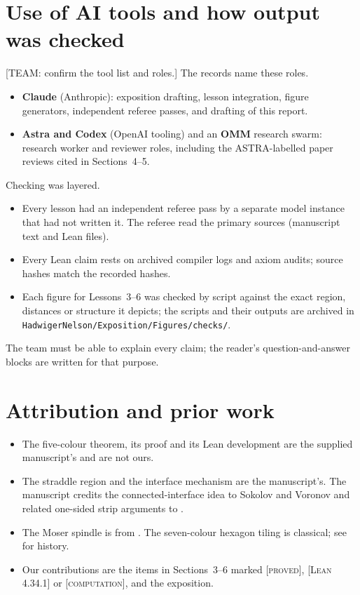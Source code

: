 \documentclass[11pt]{article}
\theoremstyle{definition}
\theoremstyle{remark}
\newcommand{\st}[1]{\textsc{[#1]}}
\begin{document}
\section{Use of AI tools and how output was checked}
[TEAM: confirm the tool list and roles.] The records name these roles.
\begin{itemize}
\item \textbf{Claude} (Anthropic): exposition drafting, lesson integration, figure generators, independent referee passes, and drafting of this report.
\item \textbf{Astra and Codex} (OpenAI tooling) and an \textbf{OMM} research swarm: research worker and reviewer roles, including the ASTRA-labelled paper reviews cited in Sections~4--5.
\end{itemize}
Checking was layered.
\begin{itemize}
\item Every lesson had an independent referee pass by a separate model instance that had not written it. The referee read the primary sources (manuscript text and Lean files).
\item Every Lean claim rests on archived compiler logs and axiom audits; source hashes match the recorded hashes.
\item Each figure for Lessons~3--6 was checked by script against the exact region, distances or structure it depicts; the scripts and their outputs are archived in \texttt{HadwigerNelson/\allowbreak{}Exposition/\allowbreak{}Figures/\allowbreak{}checks/\allowbreak{}}.
\end{itemize}
The team must be able to explain every claim; the reader's question-and-answer blocks are written for that purpose.

\section{Attribution and prior work}
\begin{itemize}
\item The five-colour theorem, its proof and its Lean development are the supplied manuscript's \cite{OAI} and are not ours.
\item The straddle region and the interface mechanism are the manuscript's. The manuscript credits the connected-interface idea to Sokolov and Voronov \cite{SokolovVoronov} and related one-sided strip arguments to \cite{SokolovVoronov,Voronov}.
\item The Moser spindle is from \cite{MoserMoser}. The seven-colour hexagon tiling is classical; see \cite{Soifer} for history.
\item Our contributions are the items in Sections~3--6 marked \st{proved}, \st{Lean 4.34.1} or \st{computation}, and the exposition.
\end{itemize}
\end{document}
